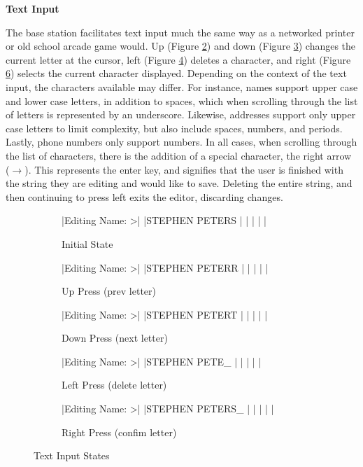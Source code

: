 \documentclass[journal,compsoc]{IEEEtran}
\begin{document}
\textbf{Text Input}

The base station facilitates text input much the same way as a networked printer or old school arcade game would. Up (Figure \ref{menu input up}) and down (Figure \ref{menu input down}) changes the current letter at the cursor, left (Figure \ref{menu input left}) deletes a character, and right (Figure \ref{menu input right}) selects the current character displayed. Depending on the context of the text input, the characters available may differ. For instance, names support upper case and lower case letters, in addition to spaces, which when scrolling through the list of letters is represented by an underscore. Likewise, addresses support only upper case letters to limit complexity, but also include spaces, numbers, and periods. Lastly, phone numbers only support numbers. In all cases, when scrolling through the list of characters, there is the addition of a special character, the right arrow ($\rightarrow$). This represents the enter key, and signifies that the user is finished with the string they are editing and would like to save. Deleting the entire string, and then continuing to press left exits the editor, discarding changes.

\begin{figure}
  \begin{subfigure}{0.48\textwidth}
  	\centering
     |Editing Name:  >|
                |STEPHEN PETERS  |
                |                |
                |                |
    \caption{Initial State}
    \label{menu input start}
  \end{subfigure}
  \begin{subfigure}{0.48\textwidth}
  	\centering
     |Editing Name:  >|
                |STEPHEN PETERR  |
                |                |
                |                |
    \caption{Up Press (prev letter)}
    \label{menu input up}
  \end{subfigure}
  \begin{subfigure}{0.48\textwidth}
  	\centering
     |Editing Name:  >|
                |STEPHEN PETERT  |
                |                |
                |                |
    \caption{Down Press (next letter)}
    \label{menu input down}
  \end{subfigure}
  \begin{subfigure}{0.48\textwidth}
  	\centering
     |Editing Name:  >|
                |STEPHEN PETE_   |
                |                |
                |                |
    \caption{Left Press (delete letter)}
    \label{menu input left}
  \end{subfigure}
  \begin{subfigure}{0.48\textwidth}
  	\centering
     |Editing Name:  >|
                |STEPHEN PETERS_ |
                |                |
                |                |
    \caption{Right Press (confim letter)}
    \label{menu input right}
  \end{subfigure}
  \caption{Text Input States}
\end{figure}
\end{document}

